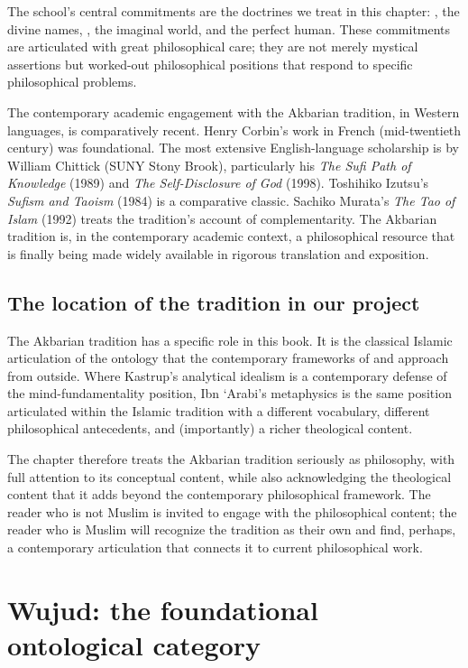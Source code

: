 The school's central commitments are the doctrines we treat in this
chapter: , the divine names, ,
the imaginal world, and the perfect human. These commitments are
articulated with great philosophical care; they are not merely
mystical assertions but worked-out philosophical positions that
respond to specific philosophical problems.

The contemporary academic engagement with the Akbarian tradition,
in Western languages, is comparatively recent. Henry Corbin's work
in French (mid-twentieth century) was foundational. The most
extensive English-language scholarship is by William Chittick
(SUNY Stony Brook), particularly his \textit{The Sufi Path of
Knowledge} (1989) and \textit{The Self-Disclosure of God} (1998).
Toshihiko Izutsu's \textit{Sufism and Taoism} (1984) is a
comparative classic. Sachiko Murata's \textit{The Tao of Islam}
(1992) treats the tradition's account of complementarity. The
Akbarian tradition is, in the contemporary academic context, a
philosophical resource that is finally being made widely available
in rigorous translation and exposition.

\subsection{The location of the tradition in our project}

The Akbarian tradition has a specific role in this book. It is the
classical Islamic articulation of the ontology that the contemporary
frameworks of  and
 approach from outside. Where Kastrup's
analytical idealism is a contemporary defense of the
mind-fundamentality position, Ibn `Arabi's metaphysics is the same
position articulated within the Islamic tradition with a different
vocabulary, different philosophical antecedents, and (importantly)
a richer theological content.

The chapter therefore treats the Akbarian tradition seriously as
philosophy, with full attention to its conceptual content, while
also acknowledging the theological content that it adds beyond the
contemporary philosophical framework. The reader who is not Muslim
is invited to engage with the philosophical content; the reader who
is Muslim will recognize the tradition as their own and find,
perhaps, a contemporary articulation that connects it to current
philosophical work.

\section{Wujud: the foundational ontological category}
\label{sec:wujud-foundational}


